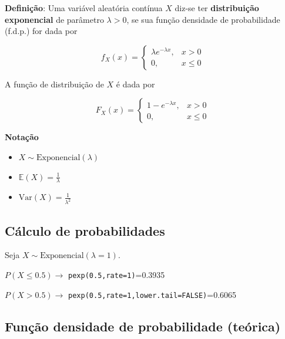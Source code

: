 \documentclass[
]{book}
\providecommand{\tightlist}{%
  \setlength{\itemsep}{0pt}\setlength{\parskip}{0pt}}
\begin{document}
\textbf{Definição}: Uma variável aleatória contínua \(X\) diz-se ter \textbf{distribuição exponencial} de parâmetro \(\lambda > 0\), se sua função densidade de probabilidade (f.d.p.) for dada por

\[
f_X(x) = 
\begin{cases}
\lambda e^{-\lambda x}, & x > 0 \\
0, & x \leq 0
\end{cases}
\]

A função de distribuição de \(X\) é dada por

\[
F_X(x) = 
\begin{cases}
1 - e^{-\lambda x}, & x > 0 \\
0, & x \leq 0
\end{cases}
\]

\textbf{Notação}

\begin{itemize}
\tightlist
\item
  \(X \sim \text{Exponencial}(\lambda)\)
\item
  \(\mathbb{E}(X) = \frac{1}{\lambda}\)
\item
  \(\text{Var}(X) = \frac{1}{\lambda^2}\)
\end{itemize}

\subsection{Cálculo de probabilidades}\label{cuxe1lculo-de-probabilidades-5}

Seja \(X\sim \text{Exponencial}(\lambda=1)\).

\(P(X\leq 0.5) \to\) \texttt{pexp(0.5,rate=1)}=0.3935

\(P(X > 0.5) \to\) \texttt{pexp(0.5,rate=1,lower.tail=FALSE)}=0.6065

\subsection{Função densidade de probabilidade (teórica)}\label{funuxe7uxe3o-densidade-de-probabilidade-teuxf3rica}
\end{document}
